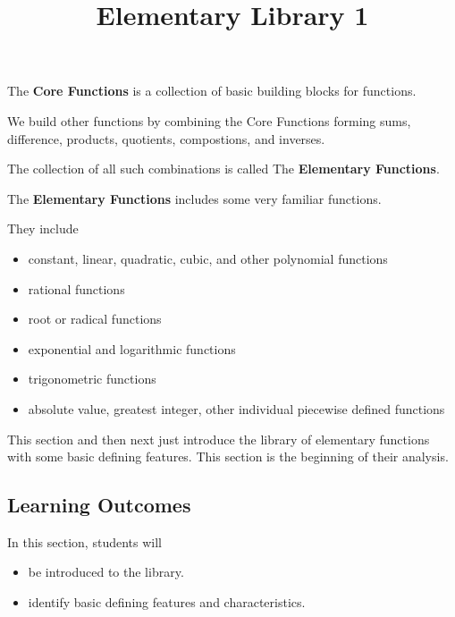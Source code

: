 \documentclass{ximera}
\title{Elementary Library 1}
\begin{document}
\begin{abstract}
\end{abstract}
\maketitle


The \textbf{Core Functions} is a collection of basic building blocks for functions.

We build other functions by combining the Core Functions forming sums, difference, products, quotients, compostions, and inverses. 

The collection of all such combinations is called The \textbf{Elementary Functions}.

The \textbf{Elementary Functions} includes some very familiar functions.

They include 

\begin{itemize}
\item constant, linear, quadratic, cubic, and other polynomial functions
\item rational functions
\item root or radical functions
\item exponential and logarithmic functions
\item trigonometric functions
\item absolute value, greatest integer, other individual piecewise defined functions
\end{itemize}



This section and then next just introduce the library of elementary functions with some basic defining features.  This section is the beginning of their analysis.












\subsection*{Learning Outcomes}

\begin{sectionOutcomes}
In this section, students will 

\begin{itemize}
\item be introduced to the library.
\item identify basic defining features and characteristics.
\end{itemize}
\end{sectionOutcomes}
\end{document}
